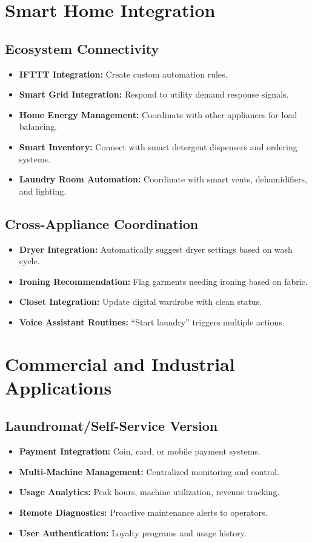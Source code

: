 \section{Smart Home Integration}

\subsection{Ecosystem Connectivity}
\begin{itemize}
    \item \textbf{IFTTT Integration:} Create custom automation rules.
    \item \textbf{Smart Grid Integration:} Respond to utility demand response signals.
    \item \textbf{Home Energy Management:} Coordinate with other appliances for load balancing.
    \item \textbf{Smart Inventory:} Connect with smart detergent dispensers and ordering systems.
    \item \textbf{Laundry Room Automation:} Coordinate with smart vents, dehumidifiers, and lighting.
\end{itemize}

\subsection{Cross-Appliance Coordination}
\begin{itemize}
    \item \textbf{Dryer Integration:} Automatically suggest dryer settings based on wash cycle.
    \item \textbf{Ironing Recommendation:} Flag garments needing ironing based on fabric.
    \item \textbf{Closet Integration:} Update digital wardrobe with clean status.
    \item \textbf{Voice Assistant Routines:} ``Start laundry'' triggers multiple actions.
\end{itemize}

\section{Commercial and Industrial Applications}

\subsection{Laundromat/Self-Service Version}
\begin{itemize}
    \item \textbf{Payment Integration:} Coin, card, or mobile payment systems.
    \item \textbf{Multi-Machine Management:} Centralized monitoring and control.
    \item \textbf{Usage Analytics:} Peak hours, machine utilization, revenue tracking.
    \item \textbf{Remote Diagnostics:} Proactive maintenance alerts to operators.
    \item \textbf{User Authentication:} Loyalty programs and usage history.
\end{itemize}

